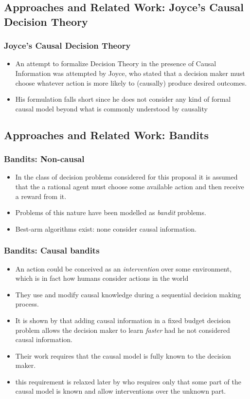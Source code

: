 \documentclass{beamer}
\theoremstyle{plain}
\begin{document}
\subsection{Approaches and Related Work: Joyce's Causal Decision Theory}
\begin{frame}
\frametitle{Joyce's Causal Decision Theory}
\begin{itemize}
\item An attempt to formalize Decision Theory in the presence of Causal Information was attempted by Joyce, who stated that a decision maker must choose whatever action is more likely to (causally) produce desired outcomes.
\item  His formulation falls short since he does not consider any kind of formal causal model beyond what is commonly understood by causality
\end{itemize}
\end{frame}
\subsection{Approaches and Related Work: Bandits}
\begin{frame}
\frametitle{Bandits: Non-causal}
\begin{itemize}
\item In the class of decision problems considered for this proposal it is assumed that the a rational agent must choose some available action and then receive a reward from it.
\item Problems of this nature have been modelled as \textit{bandit} problems.
\item Best-arm algorithms exist: none consider causal information.
\end{itemize}
\end{frame}
\begin{frame}
\frametitle{Bandits: Causal bandits}
\begin{itemize}
\item An action could be conceived as an \textit{intervention} over some environment, which is in fact how humans consider actions in the world
\item They use and modify causal knowledge during a sequential decision making process.
\item It is shown by \cite{lattimoreNIPS2016} that adding causal information in a fixed budget decision problem allows the decision maker to learn \textit{faster} had he not considered causal information.
\item Their work requires that the causal model is fully known to the decision maker.
\item this requirement is relaxed later by \cite{sen2017identifying} who requires only that some part of the causal model is known and allow interventions over the unknown part. 
\end{itemize}
\end{frame}
\end{document}
